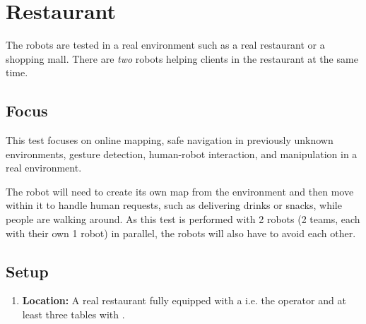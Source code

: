 \section{Restaurant}
The robots are tested in a real environment such as a real restaurant or a shopping mall.
There are \emph{two} robots helping clients in the restaurant at the same time.

\subsection{Focus}
This test focuses on online mapping, safe navigation in previously unknown environments, gesture detection, human-robot interaction, and manipulation in a real environment.

The robot will need to create its own map from the environment and then move within it to handle human requests, such as delivering drinks or snacks, while people are walking around.
As this test is performed with 2 robots (2 teams, each with their own 1 robot) in parallel, the robots will also have to avoid each other.

\subsection{Setup}
\begin{enumerate}
	\item \textbf{Location:} A real restaurant fully equipped with a  i.e. the operator and at least three tables with .
\end{enumerate}

